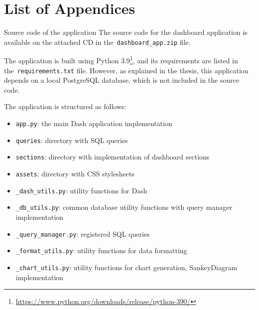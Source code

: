\appendix
{}
\chapter*{List of Appendices}
\renewcommand{\thesection}{Appendix \Alph{section}}

\begin{section}{Source code of the application}
	\label{appendix:source-code}
	The source code for the dashboard application is available on the attached CD in the~\texttt{dashboard\_app.zip} file.

	The application is built using Python 3.9\footnote{\url{https://www.python.org/downloads/release/python-390/}}, and its requirements are listed in the~\texttt{requirements.txt} file.
	However, as explained in the thesis, this application depends on a local PostgreSQL database, which is not included in the source code.

	The application is structured as follows:
	\begin{itemize}
		\item \texttt{app.py}: the main Dash application implementation
		\item \texttt{queries\/}: directory with SQL queries
		\item \texttt{sections\/}: directory with implementation of dashboard sections
		\item \texttt{assets\/}: directory with CSS stylesheets
		\item \texttt{\_dash\_utils.py}: utility functions for Dash
		\item \texttt{\_db\_utils.py}: common database utility functions with query manager implementation
		\item \texttt{\_query\_manager.py}: registered SQL queries
		\item \texttt{\_format\_utils.py}: utility functions for data formatting
		\item \texttt{\_chart\_utils.py}: utility functions for chart generation, SankeyDiagram implementation
	\end{itemize}

\end{section}